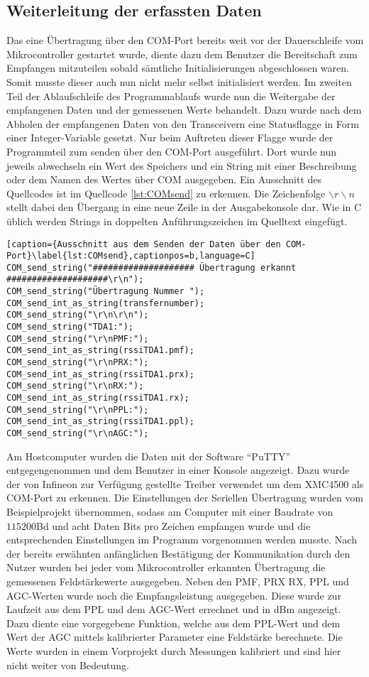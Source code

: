\subsection{Weiterleitung der erfassten Daten}
Das eine Übertragung über den COM-Port bereits weit vor der Dauerschleife vom Mikrocontroller gestartet wurde, diente dazu dem Benutzer  die Bereitschaft zum Empfangen mitzuteilen sobald sämtliche Initialisierungen abgeschlossen waren. Somit musste dieser auch nun nicht mehr selbst initialisiert werden.
Im zweiten Teil der Ablaufschleife des Programmablaufs wurde nun die Weitergabe der empfangenen Daten und der gemessenen Werte behandelt. Dazu wurde nach dem Abholen der empfangenen Daten von den Transceivern eine Statusflagge in Form einer Integer-Variable gesetzt. Nur beim Auftreten dieser Flagge wurde der Programmteil zum senden über den COM-Port ausgeführt.
Dort wurde nun jeweils abwechseln ein Wert des Speichers und ein String mit einer Beschreibung oder dem Namen des Wertes über COM ausgegeben. Ein Ausschnitt des Quellcodes ist im Quellcode \ref{lst:COMsend} zu erkennen. Die Zeichenfolge $\backslash r\backslash n$ stellt dabei den Übergang in eine neue Zeile in der Ausgabekonsole dar. Wie in C üblich werden Strings in doppelten Anführungszeichen im Quelltext eingefügt.
\begin{lstlisting}[caption={Ausschnitt aus dem Senden der Daten über den COM-Port}\label{lst:COMsend},captionpos=b,language=C]
COM_send_string("#################### Übertragung erkannt ####################\r\n");
COM_send_string("Übertragung Nummer ");
COM_send_int_as_string(transfernumber);
COM_send_string("\r\n\r\n");
COM_send_string("TDA1:");
COM_send_string("\r\nPMF:");
COM_send_int_as_string(rssiTDA1.pmf);
COM_send_string("\r\nPRX:");
COM_send_int_as_string(rssiTDA1.prx);
COM_send_string("\r\nRX:");
COM_send_int_as_string(rssiTDA1.rx);
COM_send_string("\r\nPPL:");
COM_send_int_as_string(rssiTDA1.ppl);
COM_send_string("\r\nAGC:");
\end{lstlisting}
Am Hostcomputer wurden die Daten mit der Software \enquote{PuTTY} entgegengenommen und dem Benutzer in einer Konsole angezeigt. Dazu wurde der von Infineon zur Verfügung gestellte Treiber verwendet um dem XMC4500 als COM-Port zu erkennen. %
Die Einstellungen der Seriellen Übertragung wurden vom Beispielprojekt übernommen, sodass am Computer mit einer Baudrate von $115200$Bd und acht Daten Bits pro Zeichen empfangen wurde und die entsprechenden Einstellungen im Programm vorgenommen werden musste. Nach der bereits erwähnten anfänglichen Bestätigung der Kommunikation durch den Nutzer wurden bei jeder vom Mikrocontroller erkannten   Übertragung die gemessenen Feldstärkewerte ausgegeben. Neben den PMF, PRX RX, PPL und AGC-Werten wurde noch die Empfangsleistung ausgegeben. Diese wurde zur Laufzeit aus dem PPL und dem AGC-Wert errechnet und in dBm angezeigt. Dazu diente eine vorgegebene Funktion, welche aus dem PPL-Wert und dem Wert der \ac{AGC} mittels kalibrierter Parameter eine Feldstärke berechnete. Die Werte wurden in einem Vorprojekt durch Messungen kalibriert und sind hier nicht weiter von Bedeutung.
